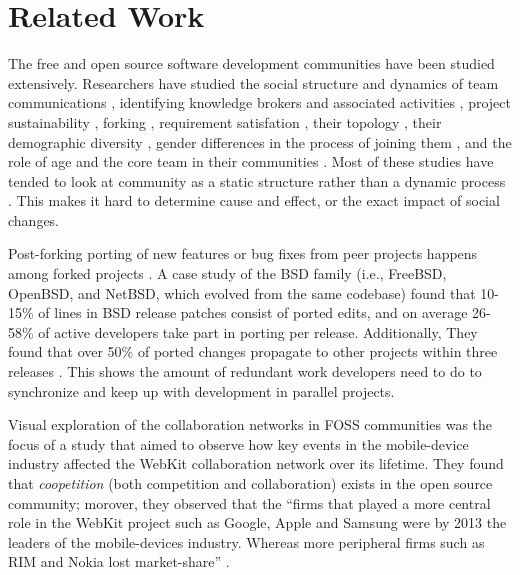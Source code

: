 \documentclass{acm_proc_article-sp}
\begin{document}
\section{Related Work}
\label{relatedwork}

The free and open source software development communities have been studied extensively. Researchers have studied the social structure and dynamics of team communications \cite{Bird}\cite{Guzzi}\cite{HowisonSocialDynamics}\cite{HowisonFlossMole}\cite{Nakakoji}, identifying knowledge brokers and associated activities \cite{Sowe}, project sustainability \cite{Nakakoji}\cite{NymanForkingSustainability}, forking \cite{NymanCodeForking}, requirement satisfation \cite{Ernst}, their topology \cite{Bird}, their demographic diversity \cite{Kunegis}, gender differences in the process of joining them \cite{Kuechler}, and the role of age and the core team in their communities \cite{AzarbakhtOSS2014}\cite{AzarbakhtINSNA2014}\cite{DavidsonVLHCC2014}\cite{Torres}. Most of these studies have tended to look at community as a static structure rather than a dynamic process \cite{CrowstonFLOSSWhatWeKnow}. This makes it hard to determine cause and effect, or the exact impact of social changes.

Post-forking porting of new features or bug fixes from peer projects happens among forked projects \cite{Baishakhi}. A case study of the BSD family (i.e., FreeBSD, OpenBSD, and NetBSD, which evolved from the same codebase) found that 10-15\% of lines in BSD release patches consist of ported edits, and on average 26-58\% of active developers take part in porting per release. Additionally, They found that over 50\% of ported changes propagate to other projects within three releases \cite{Baishakhi}. This shows the amount of redundant work developers need to do to synchronize and keep up with development in parallel projects. 

Visual exploration of the collaboration networks in FOSS communities was the focus of a study that aimed to observe how key events in the mobile-device industry affected the WebKit collaboration network over its lifetime. \cite{JoseWebKit} They found that \textit{coopetition} (both competition and collaboration) exists in the open source community; morover, they observed that the ``firms that played a more central role in the WebKit project such as Google, Apple and Samsung were by 2013 the leaders of the mobile-devices industry. Whereas more peripheral firms such as RIM and Nokia lost market-share'' \cite{JoseWebKit}. 
\end{document}
